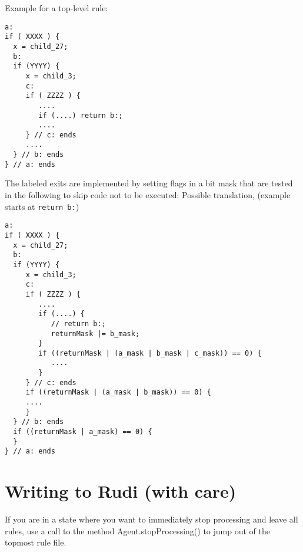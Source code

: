 Example for a top-level rule:

\begin{verbatim}
a:
if ( XXXX ) {
  x = child_27;
  b:
  if (YYYY) {
     x = child_3;
     c:
     if ( ZZZZ ) {
        ....
        if (....) return b:;
        ....
     } // c: ends
     ....
  } // b: ends
} // a: ends
\end{verbatim}

The labeled exits are implemented by setting flags in a bit mask that are
tested in the following to skip code not to be executed:
\newpage
Possible translation, (example starts at \texttt{return b:})
\begin{verbatim}
a:
if ( XXXX ) {
  x = child_27;
  b:
  if (YYYY) {
     x = child_3;
     c:
     if ( ZZZZ ) {
        ....
        if (....) {
           // return b:;
           returnMask |= b_mask;
        }
        if ((returnMask | (a_mask | b_mask | c_mask)) == 0) {
           ....
        }
     } // c: ends
     if ((returnMask | (a_mask | b_mask)) == 0) {
     ....
     }
  } // b: ends
  if ((returnMask | a_mask) == 0) {
  }
} // a: ends
\end{verbatim}

\section{Writing to Rudi (with care)}
If you are in a state where you want to immediately stop processing and leave all
rules, use a call to the method Agent.stopProcessing() to jump out of the topmost
rule file.

